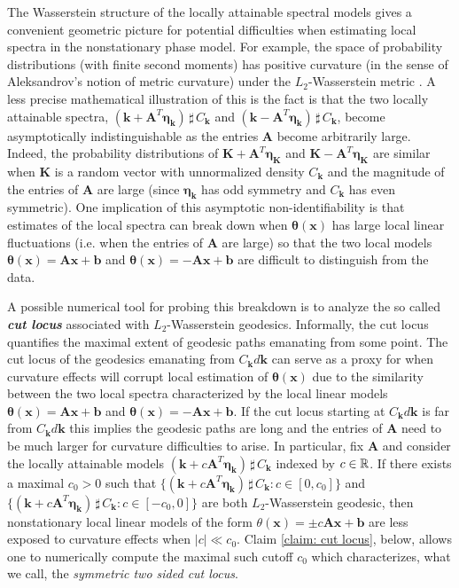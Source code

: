 \documentclass[10pt,noinfoline]{imsart}
\newcommand{\bs}{\boldsymbol}
\begin{document}
The Wasserstein structure of the locally attainable spectral models gives a convenient geometric picture for  potential difficulties when estimating local spectra in the nonstationary phase model.
For example, the space of probability distributions (with finite second moments) has positive curvature (in the sense of Aleksandrov's notion of metric curvature) under the $L_2$-Wasserstein metric \cite{ambrosio2008gradient}. 
A less precise mathematical illustration of this is the fact is that the two locally attainable spectra, $(\bs k+ \bs A^T \bs\eta_{\bs k})\,\sharp\, C_{\bs k}$ and $(\bs k- \bs A^T \bs\eta_{\bs k})\,\sharp\, C_{\bs k}$, become asymptotically indistinguishable as the entries $\bs A$ become arbitrarily large. Indeed, the probability distributions of $\bs K + \bs A^T\bs\eta_{\bs K}$ and $\bs K - \bs A^T\bs\eta_{\bs K}$ are similar when $\bs K$ is a random vector with unnormalized density $C_{\bs k}$ and the magnitude of the entries of $\bs A$ are large (since $\bs\eta_{\bs k}$ has odd symmetry and $C_{\bs k}$ has even symmetric). One implication of this asymptotic non-identifiability is that estimates of the local spectra can break down when $\bs \theta(\bs x)$ has large local linear fluctuations (i.e. when the entries of $\bs A$ are large) so that the two local models $\bs \theta(\bs x)=\bs A\bs x + \bs b$ and $\bs \theta(\bs x)=-\bs A\bs x + \bs b$ are difficult to distinguish from the data.



A possible numerical tool for probing this breakdown is to analyze the so called \textbf{\textit{cut locus}} associated with $L_2$-Wasserstein geodesics. Informally, the cut locus quantifies the maximal extent of geodesic paths emanating from some point. The cut locus of the geodesics emanating from $C_{\bs k}d\bs k$ can serve as a proxy for when curvature effects will corrupt local estimation of $\bs\theta(\bs x)$ due to the similarity between the two local spectra characterized by the local linear models $\bs \theta(\bs x)=\bs A\bs x + \bs b$ and $\bs \theta(\bs x)=-\bs A\bs x + \bs b$.  If the cut locus starting at $C_{\bs k}d\bs k$ is far from $C_{\bs k}d\bs k$ this implies the geodesic paths are long and the entries of $\bs A$ need to be much larger for curvature difficulties to arise.  In particular, fix $\bs A$ and consider the  locally attainable models $(\bs k+ c\bs A^T \bs\eta_{\bs k})\,\sharp\, C_{\bs k}$ indexed by $c\in \Bbb R$. If there exists a maximal $c_0>0$ such that $\{(\bs k+ c\bs A^T \bs\eta_{\bs k})\,\sharp\, C_{\bs k}\colon c\in[0,c_0]\}$ and $\{(\bs k+ c\bs A^T \bs\eta_{\bs k})\,\sharp\, C_{\bs k}\colon c\in[-c_0,0]\}$ are both $L_2$-Wasserstein geodesic, then nonstationary local linear models of the form $\theta(\bs x) = \pm c\bs A\bs x + \bs b$ are less exposed to curvature effects when $|c|\ll c_0$. 
Claim \ref{claim: cut locus}, below, allows one to numerically compute the maximal such cutoff $c_0$ which characterizes, what we call, the {\it symmetric two sided cut locus}. 
\end{document}
